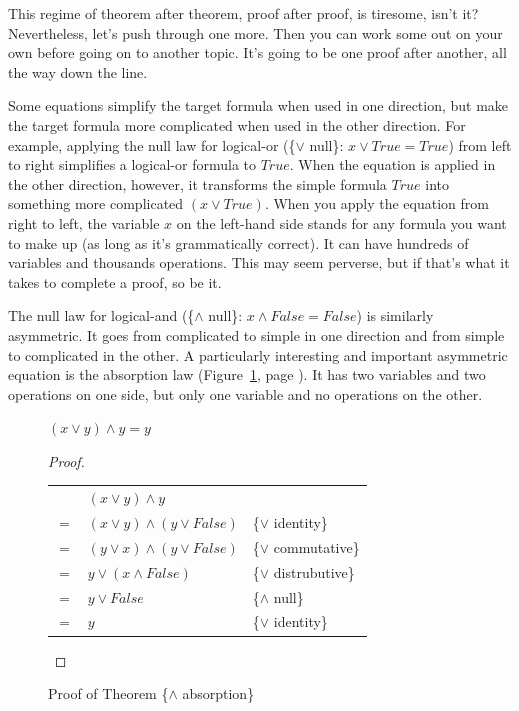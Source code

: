 This regime of theorem after theorem, proof after proof, is tiresome, isn't it?
Nevertheless, let's push through one more.
Then you can work some out on your own before going on to another topic.
It's going to be one proof after another, all the way down the line.

Some equations simplify the target formula when used in one direction,
but make the target formula more complicated when used in the other direction.
For example, applying
the null law for logical-or (\{$\vee$ null\}: $x \vee True = True$)
from left to right simplifies a logical-or formula to $True$.
When the equation is applied in the other direction, however,
it transforms the simple formula $True$ into something more complicated $(x \vee True)$.
When you apply the equation from right to left,
the variable $x$ on the left-hand side
stands for any formula you want to make up (as long as it's grammatically correct).
It can have hundreds of variables and thousands operations.
This may seem perverse, but if that's what it takes to complete a proof, so be it.

The null law for logical-and (\{$\wedge$ null\}: $x \wedge False = False$)
is similarly asymmetric.
It goes from complicated to simple in one direction
and from simple to complicated in the other.
A particularly interesting and important asymmetric equation
is the absorption law
(Figure~\ref{and-absorption-thm}, page \pageref{and-absorption-thm}).
It has two variables and two operations on one side, but only one variable and no operations on the other.

\begin{figure}
\begin{theorem}
$(x \vee y) \wedge y = y$
\end{theorem}

\begin{proof}
\mbox{} \\
\begin{tabular}{llp{3.15in}}
    & $(x \vee y) \wedge y$                & \\
$=$ & $(x \vee y) \wedge (y \vee False)$   & \{$\vee$ identity\} \\
$=$ & $(y \vee x) \wedge (y \vee False)$   & \{$\vee$ commutative\} \\
$=$ & $y \vee (x \wedge False)$            & \{$\vee$ distrubutive\} \\
$=$ & $y \vee False$                       & \{$\wedge$ null\} \\
$=$ & $y$                                  & \{$\vee$ identity\} \\
\end{tabular}

\end{proof}
\caption{Proof of Theorem \{$\wedge$ absorption\}}
\label{and-absorption-thm}
\end{figure}

